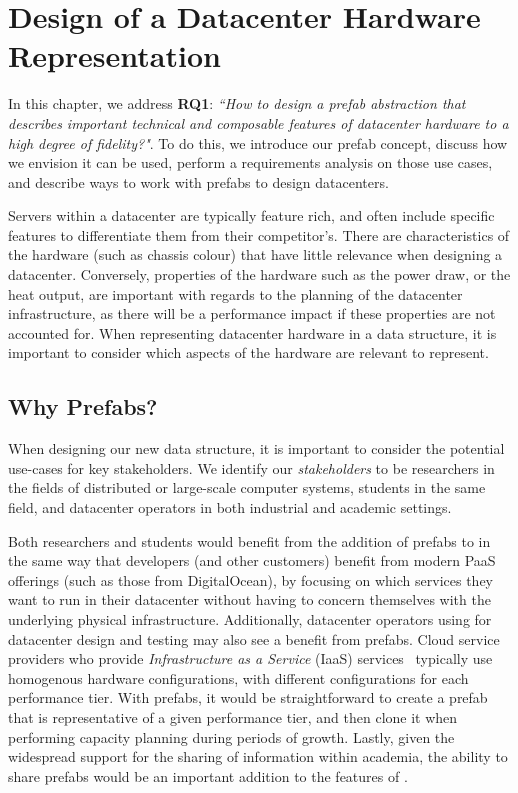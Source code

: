 \documentclass[11pt]{article}
\begin{document}
\newpage

\section{Design of a Datacenter Hardware Representation} \label{sec:design}
	In this chapter, we address \textbf{RQ1}: \textit{``How to design a prefab abstraction that describes important technical and composable features of datacenter hardware to a high degree of fidelity?"}.
	To do this, we introduce our prefab concept, discuss how we envision it can be used, perform a requirements analysis on those use cases, and describe ways to work with prefabs to design datacenters.

	Servers within a datacenter are typically feature rich, and often include specific features to differentiate them from their competitor's.
	There are characteristics of the hardware (such as chassis colour) that have little relevance when designing a datacenter.
	Conversely, properties of the hardware such as the power draw, or the heat output, are important with regards to the planning of the datacenter infrastructure, as there will be a performance impact if these properties are not accounted for.
	When representing datacenter hardware in a data structure, it is important to consider which aspects of the hardware are relevant to represent.
	
	\subsection{Why Prefabs?} \label{sec:whyprefabs}
		When designing our new data structure, it is important to consider the potential use-cases for key stakeholders.
		We identify our \textit{stakeholders} to be researchers in the fields of distributed or large-scale computer systems, students in the same field, and datacenter operators in both industrial and academic settings.

		Both researchers and students would benefit from the addition of prefabs to \opendc{} in the same way that developers (and other customers) benefit from modern PaaS offerings (such as those from DigitalOcean), by focusing on which services they want to run in their datacenter without having to concern themselves with the underlying physical infrastructure.
		Additionally, datacenter operators using \opendc{} for datacenter design and testing may also see a benefit from prefabs. 
		Cloud service providers who provide \textit{Infrastructure as a Service} (IaaS) services~\cite{Liu2011} typically use homogenous hardware configurations, with different configurations for each performance tier. 
		With prefabs, it would be straightforward to create a prefab that is representative of a given performance tier, and then clone it when performing capacity planning during periods of growth.
		Lastly, given the widespread support for the sharing of information within academia, the ability to share prefabs would be an important addition to the features of \opendc{}.
\end{document}
